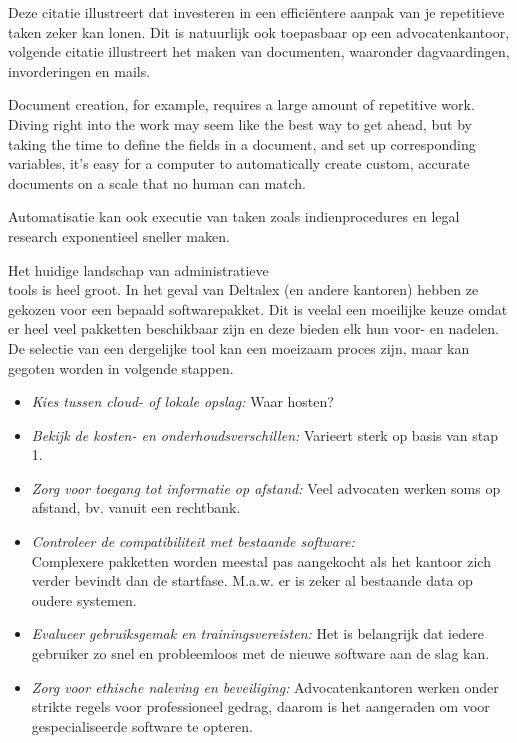 Deze citatie illustreert dat investeren in een efficiëntere aanpak van je repetitieve taken zeker kan lonen. Dit is natuurlijk ook toepasbaar op een advocatenkantoor, volgende citatie illustreert het maken van documenten, waaronder dagvaardingen, invorderingen en mails.

Document creation, for example, requires a large amount of repetitive work. Diving right into the work may seem like the best way to get ahead, but by taking the time to define the fields in a document, and set up corresponding variables, it’s easy for a computer to automatically create custom, accurate documents on a scale that no human can match.
\autocite{ThomsonReuters2023}

Automatisatie kan ook executie van taken zoals indienprocedures en legal research exponentieel sneller maken. \autocite{Aston2023}

Het huidige landschap van administratieve\\ tools is heel groot. In het geval van Deltalex (en andere kantoren) hebben ze gekozen voor een bepaald softwarepakket. Dit is veelal een moeilijke keuze omdat er heel veel pakketten beschikbaar zijn en deze bieden elk hun voor- en nadelen. De selectie van een dergelijke tool kan een moeizaam proces zijn, maar kan gegoten worden in volgende stappen.
\autocite{Clio2023}

\begin{itemize}
	\item \emph{Kies tussen cloud- of lokale opslag:} Waar hosten? 
        \item \emph{Bekijk de kosten- en onderhoudsverschillen:} Varieert sterk op basis van stap 1.
        \item \emph{Zorg voor toegang tot informatie op afstand:} Veel advocaten werken soms op afstand, bv. vanuit een rechtbank.
        \item \emph{Controleer de compatibiliteit met bestaande software:}\\ Complexere pakketten worden meestal pas aangekocht als het kantoor zich verder bevindt dan de startfase. M.a.w. er is zeker al bestaande data op oudere systemen.
        \item \emph{Evalueer gebruiksgemak en trainingsvereisten:} Het is belangrijk dat iedere gebruiker zo snel en probleemloos met de nieuwe software aan de slag kan.
        \item \emph{Zorg voor ethische naleving en beveiliging:} Advocatenkantoren werken onder strikte regels voor professioneel gedrag, daarom is het aangeraden om voor gespecialiseerde software te opteren.
\end{itemize}

